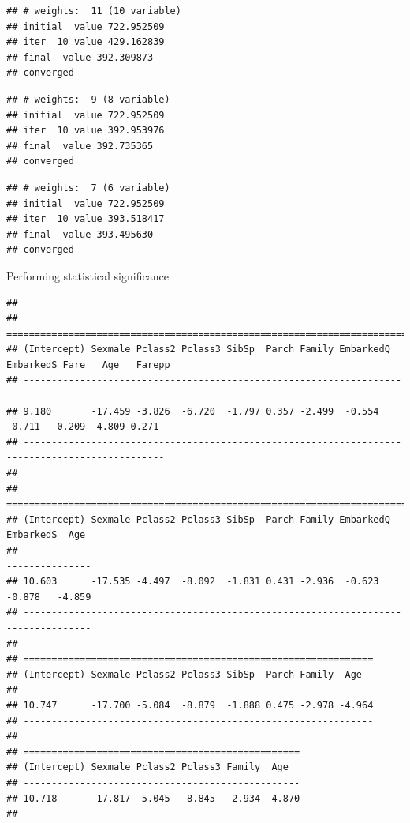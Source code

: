 \documentclass[
]{article}
\begin{document}
\begin{verbatim}
## # weights:  11 (10 variable)
## initial  value 722.952509 
## iter  10 value 429.162839
## final  value 392.309873 
## converged
\end{verbatim}

\begin{verbatim}
## # weights:  9 (8 variable)
## initial  value 722.952509 
## iter  10 value 392.953976
## final  value 392.735365 
## converged
\end{verbatim}

\begin{verbatim}
## # weights:  7 (6 variable)
## initial  value 722.952509 
## iter  10 value 393.518417
## final  value 393.495630 
## converged
\end{verbatim}

Performing statistical significance

\begin{verbatim}
## 
## ===============================================================================================
## (Intercept) Sexmale Pclass2 Pclass3 SibSp  Parch Family EmbarkedQ EmbarkedS Fare   Age   Farepp
## -----------------------------------------------------------------------------------------------
## 9.180       -17.459 -3.826  -6.720  -1.797 0.357 -2.499  -0.554    -0.711   0.209 -4.809 0.271 
## -----------------------------------------------------------------------------------------------
## 
## ==================================================================================
## (Intercept) Sexmale Pclass2 Pclass3 SibSp  Parch Family EmbarkedQ EmbarkedS  Age  
## ----------------------------------------------------------------------------------
## 10.603      -17.535 -4.497  -8.092  -1.831 0.431 -2.936  -0.623    -0.878   -4.859
## ----------------------------------------------------------------------------------
## 
## ==============================================================
## (Intercept) Sexmale Pclass2 Pclass3 SibSp  Parch Family  Age  
## --------------------------------------------------------------
## 10.747      -17.700 -5.084  -8.879  -1.888 0.475 -2.978 -4.964
## --------------------------------------------------------------
## 
## =================================================
## (Intercept) Sexmale Pclass2 Pclass3 Family  Age  
## -------------------------------------------------
## 10.718      -17.817 -5.045  -8.845  -2.934 -4.870
## -------------------------------------------------
\end{verbatim}
\end{document}
